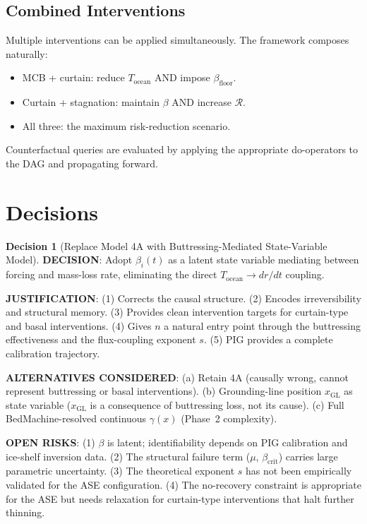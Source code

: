 \documentclass[11pt]{article}
\theoremstyle{definition}
\newtheorem{decision}{Decision}
\begin{document}
\subsection{Combined Interventions}
Multiple interventions can be applied simultaneously.  The framework composes naturally:
\begin{itemize}
  \item MCB + curtain: reduce $T_{\text{ocean}}$ AND impose $\beta_{\text{floor}}$.
  \item Curtain + stagnation: maintain $\beta$ AND increase $\mathcal{R}$.
  \item All three: the maximum risk-reduction scenario.
\end{itemize}
Counterfactual queries are evaluated by applying the appropriate do-operators to the DAG and propagating forward.


\section{Decisions}
\label{sec:decisions}

\begin{decision}[Replace Model 4A with Buttressing-Mediated State-Variable Model]
\textbf{DECISION}: Adopt $\beta_i(t)$ as a latent state variable mediating between forcing and mass-loss rate, eliminating the direct $T_{\text{ocean}} \to dr/dt$ coupling.

\textbf{JUSTIFICATION}: (1) Corrects the causal structure. (2) Encodes irreversibility and structural memory. (3) Provides clean intervention targets for curtain-type and basal interventions. (4) Gives $n$ a natural entry point through the buttressing effectiveness and the flux-coupling exponent $s$. (5) PIG provides a complete calibration trajectory.

\textbf{ALTERNATIVES CONSIDERED}: (a) Retain 4A (causally wrong, cannot represent buttressing or basal interventions). (b) Grounding-line position $x_\text{GL}$ as state variable ($x_\text{GL}$ is a consequence of buttressing loss, not its cause). (c) Full BedMachine-resolved continuous $\gamma(x)$ (Phase~2 complexity).

\textbf{OPEN RISKS}: (1) $\beta$ is latent; identifiability depends on PIG calibration and ice-shelf inversion data. (2) The structural failure term ($\mu$, $\beta_{\text{crit}}$) carries large parametric uncertainty. (3) The theoretical exponent $s$ has not been empirically validated for the ASE configuration. (4) The no-recovery constraint is appropriate for the ASE but needs relaxation for curtain-type interventions that halt further thinning.
\end{decision}
\end{document}
